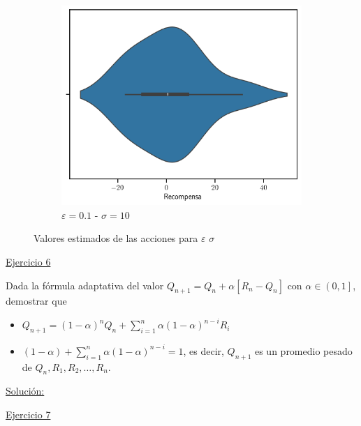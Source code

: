 \documentclass[12pt]{article}
\newlength\tindent
\renewcommand{\indent}{\hspace*{\tindent}}
\begin{document}
\begin{figure}[]
\begin{subfigure}[H]{0.3\textwidth}
        \end{subfigure}
        \begin{subfigure}[H]{0.3\textwidth}
            \includegraphics[width=\textwidth]{../img/values_sigma_10_epsilon_0.1}
            \caption{$\varepsilon=0.1$ - $\sigma=10$}
            \label{fig:estimations_8}
        \end{subfigure}

        \caption{Valores estimados de las acciones para $\varepsilon$ $\sigma$}
        \label{fig:estimations}
    \end{figure}

    \lipsum[2]

    \indent\underline{Ejercicio 6}

    Dada la fórmula adaptativa del valor $Q_{n+1}= Q_n+\alpha\left[R_{n}-Q_{n}\right]$ con $\alpha\in\left(0,1\right]$, demostrar que

    \begin{itemize}
        \item $Q_{n+1}=(1-\alpha)^{n}Q_{n} + \sum_{i=1}^n \alpha(1-\alpha)^{n-i}R_{i}$
        \item $(1-\alpha)+\sum_{i=1}^{n} \alpha(1-\alpha)^{n-i}=1$, es decir, $Q_{n+1}$ es un promedio pesado de $Q_{n},R_1,R_2,\dots,R_n$.
    \end{itemize}

    \indent\underline{Solución:}

    \lipsum[2]

    \indent\underline{Ejercicio 7}
\end{document}
